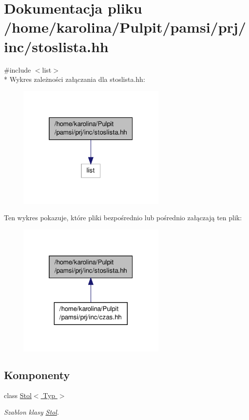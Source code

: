 \hypertarget{stoslista_8hh}{\section{Dokumentacja pliku /home/karolina/\-Pulpit/pamsi/prj/inc/stoslista.hh}
\label{stoslista_8hh}
}
{\ttfamily \#include $<$list$>$}\\*
Wykres zależności załączania dla stoslista.\-hh\-:\nopagebreak
\begin{figure}[H]
\begin{center}
\leavevmode
\includegraphics[width=208pt]{stoslista_8hh__incl}
\end{center}
\end{figure}
Ten wykres pokazuje, które pliki bezpośrednio lub pośrednio załączają ten plik\-:
\nopagebreak
\begin{figure}[H]
\begin{center}
\leavevmode
\includegraphics[width=208pt]{stoslista_8hh__dep__incl}
\end{center}
\end{figure}
\subsection*{Komponenty}
\begin{DoxyCompactItemize}
\item 
class \hyperlink{class_stol}{Stol$<$ Typ $>$}
\begin{DoxyCompactList}\small\item\em Szablon klasy \hyperlink{class_stol}{Stol}. \end{DoxyCompactList}\end{DoxyCompactItemize}
